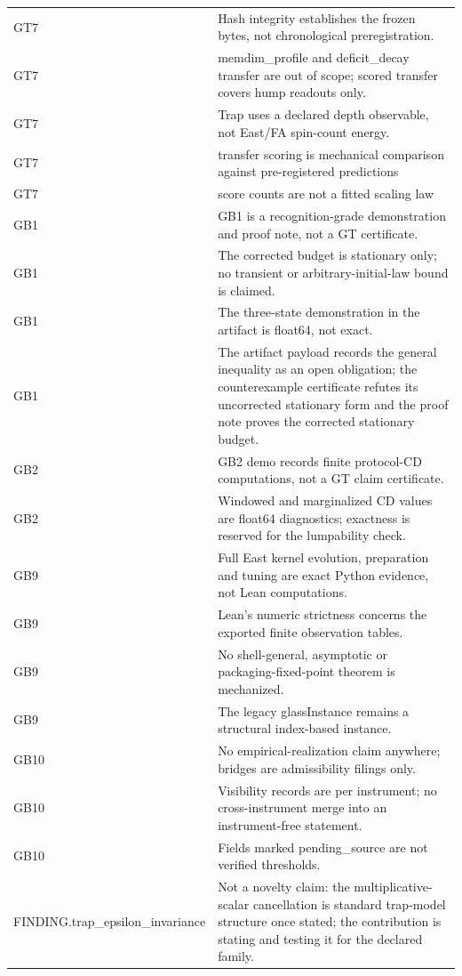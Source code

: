 \begin{longtable}{>{\raggedright\arraybackslash}p{3.6cm}p{11.6cm}}
GT7 & Hash integrity establishes the frozen bytes, not chronological preregistration. \\
GT7 & memdim\_profile and deficit\_decay transfer are out of scope; scored transfer covers hump readouts only. \\
GT7 & Trap uses a declared depth observable, not East/FA spin-count energy. \\
GT7 & transfer scoring is mechanical comparison against pre-registered predictions \\
GT7 & score counts are not a fitted scaling law \\
GB1 & GB1 is a recognition-grade demonstration and proof note, not a GT certificate. \\
GB1 & The corrected budget is stationary only; no transient or arbitrary-initial-law bound is claimed. \\
GB1 & The three-state demonstration in the artifact is float64, not exact. \\
GB1 & The artifact payload records the general inequality as an open obligation; the counterexample certificate refutes its uncorrected stationary form and the proof note proves the corrected stationary budget. \\
GB2 & GB2 demo records finite protocol-CD computations, not a GT claim certificate. \\
GB2 & Windowed and marginalized CD values are float64 diagnostics; exactness is reserved for the lumpability check. \\
GB9 & Full East kernel evolution, preparation and tuning are exact Python evidence, not Lean computations. \\
GB9 & Lean's numeric strictness concerns the exported finite observation tables. \\
GB9 & No shell-general, asymptotic or packaging-fixed-point theorem is mechanized. \\
GB9 & The legacy glassInstance remains a structural index-based instance. \\
GB10 & No empirical-realization claim anywhere; bridges are admissibility filings only. \\
GB10 & Visibility records are per instrument; no cross-instrument merge into an instrument-free statement. \\
GB10 & Fields marked pending\_source are not verified thresholds. \\
FINDING.\allowbreak{}trap\_\allowbreak{}epsilon\_\allowbreak{}invariance & Not a novelty claim: the multiplicative-scalar cancellation is standard trap-model structure once stated; the contribution is stating and testing it for the declared family. \\

\end{longtable}
